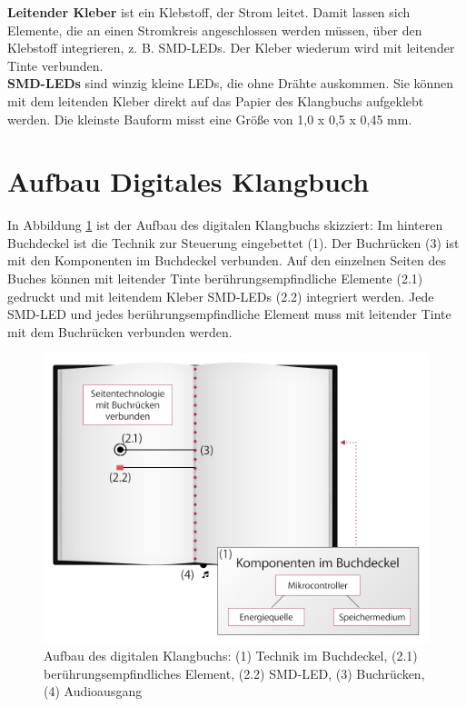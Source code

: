\textbf{Leitender Kleber} ist ein Klebstoff, der Strom leitet. Damit lassen sich Elemente, die an einen Stromkreis angeschlossen werden müssen, über den Klebstoff integrieren, z. B. SMD-LEDs. Der Kleber wiederum wird mit leitender Tinte verbunden.\\


\textbf{SMD-LEDs} sind winzig kleine LEDs, die ohne Drähte auskommen. Sie können mit dem leitenden Kleber direkt auf das Papier des Klangbuchs aufgeklebt werden. Die kleinste Bauform misst eine Größe von 1,0 x 0,5 x 0,45 mm.\\




\section{Aufbau Digitales Klangbuch}
In Abbildung \ref{fig:aufbauBuch} ist der Aufbau des digitalen Klangbuchs skizziert: Im hinteren Buchdeckel ist die Technik zur Steuerung eingebettet (1). Der Buchrücken (3) ist mit den Komponenten im Buchdeckel verbunden. Auf den einzelnen Seiten des Buches können mit leitender Tinte berührungsempfindliche Elemente (2.1) gedruckt und mit leitendem Kleber SMD-LEDs (2.2) integriert werden. Jede SMD-LED und jedes berührungsempfindliche Element muss mit leitender Tinte mit dem Buchrücken verbunden werden.


\begin{figure}[H]
\centering
\includegraphics[width=1.0\textwidth]{grafiken/aufbau-klangbuch.jpg}
\caption{Aufbau des digitalen Klangbuchs: (1) Technik im Buchdeckel, (2.1) berührungsempfindliches Element, (2.2) SMD-LED, (3) Buchrücken, (4) Audioausgang }
\label{fig:aufbauBuch}
\end{figure}


